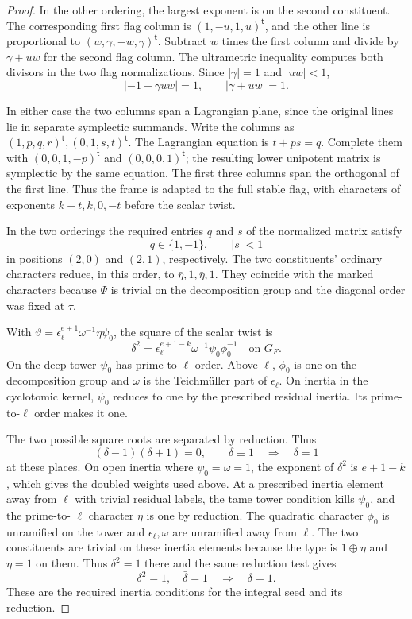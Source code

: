 \begin{proof}
In the other ordering, the largest exponent is on
the second constituent. The corresponding first flag
column is \((1,-u,1,u)^{\mathsf t}\), and the other
line is proportional to
\((w,\gamma,-w,\gamma)^{\mathsf t}\).
Subtract \(w\) times the first column and divide by
\(\gamma+uw\) for the second flag column.
The ultrametric inequality computes both divisors in the two flag normalizations. Since \(|\gamma|=1\) and \(|uw|<1\),
\[
 |-1-\gamma uw|=1,\qquad |\gamma+uw|=1 .
\]

In either case the two columns span a Lagrangian
plane, since the original lines lie in separate
symplectic summands. Write the columns as
\((1,p,q,r)^{\mathsf t},(0,1,s,t)^{\mathsf t}\).
The Lagrangian equation is \(t+ps=q\). Complete them
with \((0,0,1,-p)^{\mathsf t}\) and
\((0,0,0,1)^{\mathsf t}\); the resulting lower
unipotent matrix is symplectic by the same equation.
The first three columns span the orthogonal of the
first line. Thus the frame is adapted to the full
stable flag, with characters of exponents
\(k+t,k,0,-t\) before the scalar twist.

In the two orderings the required entries \(q\) and \(s\) of the normalized matrix satisfy
\[
 q\in\{1,-1\},\qquad |s|<1
\]
in positions \((2,0)\) and \((2,1)\), respectively.
The two constituents' ordinary characters reduce,
in this order, to \(\bar\eta,1,\bar\eta,1\).
They coincide with the marked characters because
\(\overline\Psi\) is trivial on the decomposition
group and the diagonal order was fixed at \(\tau\).

With \(\vartheta=\epsilon_\ell^{e+1}\omega^{-1}\eta\psi_0\),
the square of the scalar twist is
\[
 \delta^2=\epsilon_\ell^{e+1-k}\omega^{-1}\psi_0\phi_0^{-1}
 \quad\text{on }G_F.
\]
On the deep tower \(\psi_0\) has prime-to-\(\ell\) order.
Above \(\ell\), \(\phi_0\) is one on the decomposition
group and \(\omega\) is the Teichm\"uller part of
\(\epsilon_\ell\). On inertia in the cyclotomic kernel,
\(\psi_0\) reduces to one by the prescribed residual
inertia. Its prime-to-\(\ell\) order makes it one.

The two possible square roots are separated by reduction. Thus
\[
 (\delta-1)(\delta+1)=0,\qquad\delta\equiv1\quad\Longrightarrow\quad \delta=1
\]
at these places. On open inertia where
\(\psi_0=\omega=1\), the exponent of \(\delta^2\) is
\(e+1-k\), which gives the doubled weights used
above. At a prescribed inertia element away from
\(\ell\) with trivial residual labels, the tame
tower condition kills \(\psi_0\), and the prime-to-
\(\ell\) character \(\eta\) is one by reduction. The
quadratic character \(\phi_0\) is unramified on the
tower and \(\epsilon_\ell,\omega\) are unramified away
from \(\ell\). The two constituents are trivial on these inertia elements because the type is \(1\oplus\eta\) and \(\eta=1\) on them. Thus \(\delta^2=1\) there and the same reduction test gives
\[
 \delta^2=1,\quad\bar\delta=1\quad\Longrightarrow\quad\delta=1 .
\]
These are the required inertia conditions for the
integral seed and its reduction.


\end{proof}

